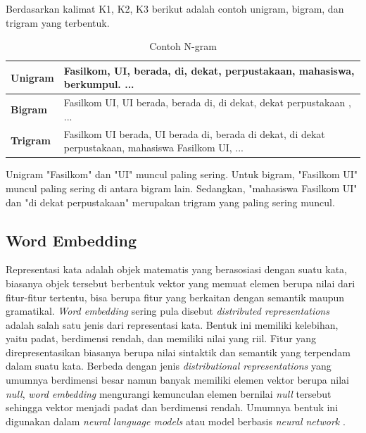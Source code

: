 	\noindent Berdasarkan kalimat K1, K2, K3 berikut adalah contoh unigram, bigram, dan trigram yang terbentuk.
	\begin{table}
		\centering
		\caption{Contoh N-gram}
		\label{table:ngram}
		\begin{tabular}{|p{3cm}|p{8cm}|}
			\hline
			\textbf{Unigram} & Fasilkom, UI, berada, di, dekat, perpustakaan, mahasiswa, berkumpul. ...       \\ \hline
			\textbf{Bigram}  & Fasilkom UI, UI berada, berada di, di dekat, dekat perpustakaan , ...		           \\ \hline
			\textbf{Trigram} & Fasilkom UI berada, UI berada di, berada di dekat, di dekat perpustakaan, mahasiswa Fasilkom UI, ... \\ \hline
		\end{tabular}
	\end{table}
	\noindent Unigram "Fasilkom" dan "UI" muncul paling sering. Untuk bigram, "Fasilkom UI" muncul paling sering di antara bigram lain. Sedangkan, "mahasiswa Fasilkom UI" dan "di dekat perpustakaan" merupakan trigram yang paling sering muncul.
	
	
	\subsection{Word Embedding} \label{word-embedding}
	Representasi kata adalah objek matematis yang berasosiasi dengan suatu kata, biasanya objek tersebut berbentuk vektor yang memuat elemen berupa nilai dari fitur-fitur tertentu, bisa berupa fitur yang berkaitan dengan semantik maupun gramatikal. \textit{Word embedding} sering pula disebut \textit{distributed representations} adalah salah satu jenis dari representasi kata. Bentuk ini memiliki kelebihan, yaitu padat, berdimensi rendah, dan memiliki nilai yang riil. Fitur yang direpresentasikan biasanya berupa nilai sintaktik dan semantik yang terpendam dalam suatu kata. Berbeda dengan jenis \textit{distributional representations} yang umumnya berdimensi besar namun banyak memiliki elemen vektor berupa nilai \textit{null}, \textit{word embedding} mengurangi kemunculan elemen bernilai \textit{null} tersebut sehingga vektor menjadi padat dan berdimensi rendah. Umumnya bentuk ini digunakan dalam \textit{neural language models} atau model berbasis \textit{neural network} \citep{Turian:2010:WRS:1858681.1858721}.
	
